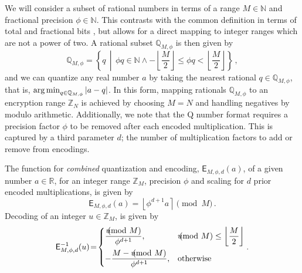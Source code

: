 \documentclass[10pt,letterpaper,oneside,twocolumn,journal]{IEEEtran}
\theoremstyle{definition}
\theoremstyle{definition}
\theoremstyle{remark}
\begin{document}
We will consider a subset of rational numbers in terms of a range $M \in \mathbb{N}$ and fractional precision $\phi \in \mathbb{N}$. This contrasts with the common definition in terms of total and fractional bits \cite{oberstarFixedPointRepresentationFractional2007,schulzedarupEncryptedCooperativeControl2019,farokhiSecurePrivateControl2017}, but allows for a direct mapping to integer ranges which are not a power of two. A rational subset $\mathbb{Q}_{M,\phi}$ is then given by
\begin{equation}
    \mathbb{Q}_{M,\phi} = \left\{q \,\middle|\, \phi q \in \mathbb{N} \wedge -\left\lfloor\frac{M}{2}\right\rfloor \leq \phi q < \left\lfloor\frac{M}{2}\right\rfloor \right\}\,,
\end{equation}
and we can quantize any real number $a$ by taking the nearest rational $q \in \mathbb{Q}_{M,\phi}$, that is, $\operatorname*{arg\,min}_{q\in\mathbb{Q}_{M,\phi}} |a-q|$. In this form, mapping rationals $\mathbb{Q}_{M,\phi}$ to an encryption range $\mathbb{Z}_N$ is achieved by choosing $M=N$ and handling negatives by modulo arithmetic. Additionally, we note that the Q number format requires a precision factor $\phi$ to be removed after each encoded multiplication. This is captured by a third parameter $d$; the number of multiplication factors to add or remove from encodings.

The function for \textit{combined} quantization and encoding, $\mathsf{E}_{M,\phi,d}(a)$, of a given number $a \in \mathbb{R}$, for an integer range $\mathbb{Z}_M$, precision $\phi$ and scaling for $d$ prior encoded multiplications, is given by
\begin{equation}
    \mathsf{E}_{M,\phi,d}(a) = \left\lfloor \phi^{d+1} a \right\rceil \pmod{M}\,. \label{eqn:encode}
\end{equation}
Decoding of an integer $u \in \mathbb{Z}_M$, is given by
\begin{equation}
    \mathsf{E}^{-1}_{M,\phi,d}(u) \!=\! 
    \begin{dcases}
        \frac{u\hspace{-8pt}\pmod{M}}{\phi^{d+1}}, &u\hspace{-8pt}\pmod{M} \leq \left\lfloor\frac{M}{2}\right\rfloor \\
        -\frac{M - u\hspace{-8pt}\pmod{M}}{\phi^{d+1}}, &\text{otherwise} \\
    \end{dcases}.\label{eqn:decode}
\end{equation}
\end{document}
